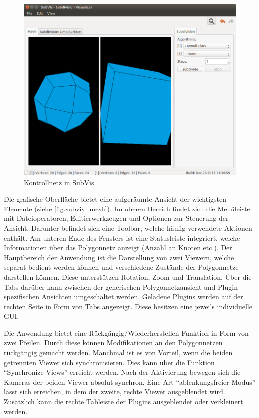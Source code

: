 \begin{figure}
  \centering
  \includegraphics[width=\textwidth]{content/media/subvis_mesh.png}
  \caption{Kontrollnetz in SubVis}
  \label{fig:subvis_mesh}
\end{figure}

Die grafische Oberfläche bietet eine aufgeräumte Ansicht der wichtigsten Elemente (siehe \autoref{fig:subvis_mesh}). 
Im oberen Bereich findet sich die Menüleiste mit Dateioperatoren, Editierwerkzeugen und Optionen zur Steuerung der Ansicht.
Darunter befindet sich eine Toolbar, welche häufig verwendete Aktionen enthält.
Am unteren Ende des Fensters ist eine Statusleiste integriert, welche Informationen über das Polygonnetz anzeigt (Anzahl an Knoten etc.).
Der Hauptbereich der Anwendung ist die Darstellung von zwei Viewern, welche separat bedient werden können und verschiedene Zustände der Polygonnetze darstellen können.
Diese unterstützen Rotation, Zoom und Translation.
Über die Tabs darüber kann zwischen der generischen Polygonnetzansicht und Plugin-spezifischen Ansichten umgeschaltet werden.
Geladene Plugins werden auf der rechten Seite in Form von Tabs angezeigt.
Diese besitzen eine jeweils individuelle GUI.

Die Anwendung bietet eine Rückgängig/Wiederherstellen Funktion in Form von zwei Pfeilen. Durch diese können Modifikationen an den Polygonnetzen rückgängig gemacht werden.
Manchmal ist es von Vorteil, wenn die beiden getrennten Viewer sich synchronisieren.
Dies kann über die Funktion \enquote{Synchronize Views} erreicht werden. 
Nach der Aktivierung bewegen sich die Kameras der beiden Viewer absolut synchron.
Eine Art \enquote{ablenkungsfreier Modus} lässt sich erreichen, in dem der zweite, rechte Viewer ausgeblendet wird. 
Zusätzlich kann die rechte Tableiste der Plugins ausgeblendet oder verkleinert werden.

